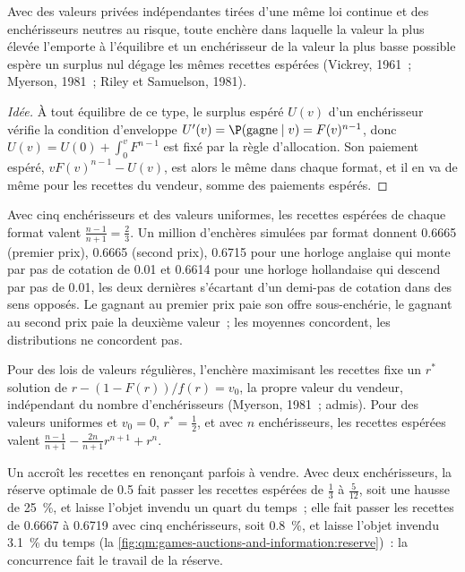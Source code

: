 \begin{theorem}\label{thm:qm:games-auctions-and-information:re}
Avec des valeurs privées indépendantes tirées d'une même loi continue et des enchérisseurs neutres au risque, toute enchère dans laquelle la valeur la plus élevée l'emporte à l'équilibre et un enchérisseur de la valeur la plus basse possible
espère un surplus nul dégage les mêmes recettes espérées (Vickrey, 1961~; Myerson, 1981~; Riley et Samuelson, 1981).
\end{theorem}

\begin{proof}[Idée]
À tout équilibre de ce type, le surplus espéré $U(v)$ d'un enchérisseur vérifie la condition d'enveloppe $U'(v) = \P(\text{gagne} \mid v) = F(v)^{n-1}$, donc $U(v) = U(0) + \int_0^vF^{n-1}$ est fixé par la règle d'allocation. Son
paiement espéré, $vF(v)^{n-1} - U(v)$, est alors le même dans chaque format, et il en va de même pour les recettes du vendeur, somme des paiements espérés.
\end{proof}

Avec cinq enchérisseurs et des valeurs uniformes, les recettes espérées de chaque format valent $\frac{n-1}{n+1} = \frac23$. Un million d'enchères simulées par format donnent 0.6665 (premier prix), 0.6665 (second prix), 0.6715 pour
une horloge anglaise qui monte par pas de cotation de 0.01 et 0.6614 pour une horloge hollandaise qui descend par pas de 0.01, les deux dernières s'écartant d'un demi-pas de cotation dans des sens opposés. Le gagnant au premier prix paie son offre sous-enchérie, le
gagnant au second prix paie la deuxième valeur~; les moyennes concordent, les distributions ne concordent pas.

\begin{proposition}\label{prop:qm:games-auctions-and-information:reserve}
Pour des lois de valeurs régulières, l'enchère maximisant les recettes fixe un  $r^*$ solution de $r - (1 - F(r))/f(r) = v_0$, la propre valeur du vendeur, indépendant du nombre d'enchérisseurs (Myerson, 1981~;
admis). Pour des valeurs uniformes et $v_0 = 0$, $r^* = \frac12$, et avec $n$ enchérisseurs, les recettes espérées valent $\frac{n-1}{n+1} - \frac{2n}{n+1}r^{n+1} + r^n$.
\end{proposition}

Un  accroît les recettes en renonçant parfois à vendre. Avec deux enchérisseurs, la réserve optimale de 0.5 fait passer les recettes espérées de $\frac13$ à $\frac5{12}$, soit une hausse de 25~\%, et laisse l'objet invendu un quart du temps~;
elle fait passer les recettes de 0.6667 à 0.6719 avec cinq enchérisseurs, soit 0.8~\%, et laisse l'objet invendu 3.1~\% du temps (la \cref{fig:qm:games-auctions-and-information:reserve})~: la concurrence fait le travail de la réserve.

